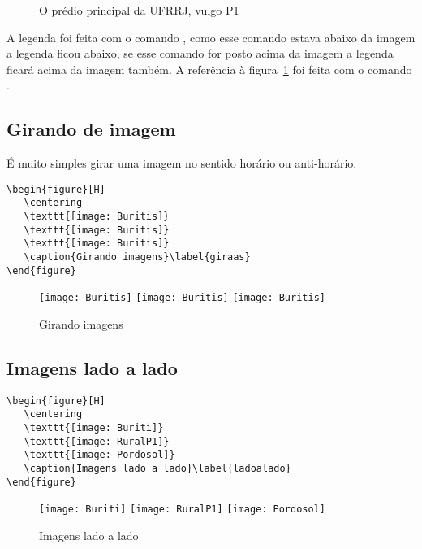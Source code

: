 \begin{figure}[H]
	\caption{O prédio principal da UFRRJ, vulgo P1}
	\label{op1}
\end{figure}

A legenda foi feita com o comando , como esse comando estava abaixo da imagem a legenda ficou abaixo, se esse comando for posto acima da imagem a legenda ficará acima da imagem também. A referência à figura~\ref{op1} foi feita com o comando .

\subsection{Girando de imagem}

É muito simples girar uma imagem no sentido horário ou anti-horário.
\begin{tcolorbox}
\begin{lstlisting}
\begin{figure}[H]
   \centering
   \texttt{[image: Buritis]}
   \texttt{[image: Buritis]}
   \texttt{[image: Buritis]}
   \caption{Girando imagens}\label{giraas}
\end{figure}
\end{lstlisting}
\end{tcolorbox}

\begin{figure}[H]
	\centering
	\texttt{[image: Buritis]}
	\texttt{[image: Buritis]}
	\texttt{[image: Buritis]}
	\caption{Girando imagens}\label{giraas}
\end{figure}


\subsection{Imagens lado a lado}

\begin{tcolorbox}
\begin{lstlisting}
\begin{figure}[H]
   \centering
   \texttt{[image: Buriti]}
   \texttt{[image: RuralP1]}
   \texttt{[image: Pordosol]}
   \caption{Imagens lado a lado}\label{ladoalado}
\end{figure}
\end{lstlisting}
\end{tcolorbox}

\begin{figure}[H]
	\centering
	\texttt{[image: Buriti]}
	\texttt{[image: RuralP1]}
	\texttt{[image: Pordosol]}
	\caption{Imagens lado a lado}\label{ladoalado}
\end{figure}

